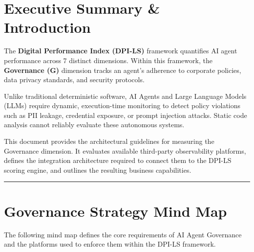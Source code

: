 \documentclass[11pt,a4paper]{article}
\begin{document}
\pagecolor{white}
\color{black}

\tableofcontents
\vspace{1cm}

\section{Executive Summary \& Introduction}

\begin{dpinote}
The \textbf{Digital Performance Index (DPI-LS)} framework quantifies AI agent performance across 7 distinct dimensions. Within this framework, the \textbf{Governance (G)} dimension tracks an agent's adherence to corporate policies, data privacy standards, and security protocols.
\end{dpinote}

Unlike traditional deterministic software, AI Agents and Large Language Models (LLMs) require dynamic, execution-time monitoring to detect policy violations such as PII leakage, credential exposure, or prompt injection attacks. Static code analysis cannot reliably evaluate these autonomous systems.

This document provides the architectural guidelines for measuring the Governance dimension. It evaluates available third-party observability platforms, defines the integration architecture required to connect them to the DPI-LS scoring engine, and outlines the resulting business capabilities.

\vspace{0.5cm}
\hrule
\vspace{0.5cm}

\section{Governance Strategy Mind Map}

The following mind map defines the core requirements of AI Agent Governance and the platforms used to enforce them within the DPI-LS framework.
\end{document}
